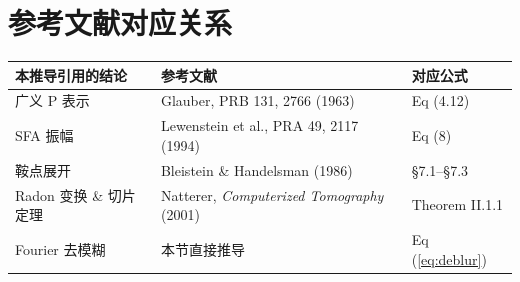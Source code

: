\documentclass[12pt,a4paper]{ctexart}
\begin{document}
\section{参考文献对应关系}

\begin{center}
\begin{tabular}{p{4cm}p{4cm}p{6cm}}
\toprule
\textbf{本推导引用的结论} & \textbf{参考文献} & \textbf{对应公式} \\
\midrule
广义 P 表示 & Glauber, PRB 131, 2766 (1963) & Eq (4.12) \\
SFA 振幅 & Lewenstein et al., PRA 49, 2117 (1994) & Eq (8) \\
鞍点展开 & Bleistein \& Handelsman (1986) & §7.1--§7.3 \\
Radon 变换 \& 切片定理 & Natterer, \textit{Computerized Tomography} (2001) & Theorem II.1.1 \\
Fourier 去模糊 & 本节直接推导 & Eq (\ref{eq:deblur}) \\
\bottomrule
\end{tabular}
\end{center}
\end{document}
